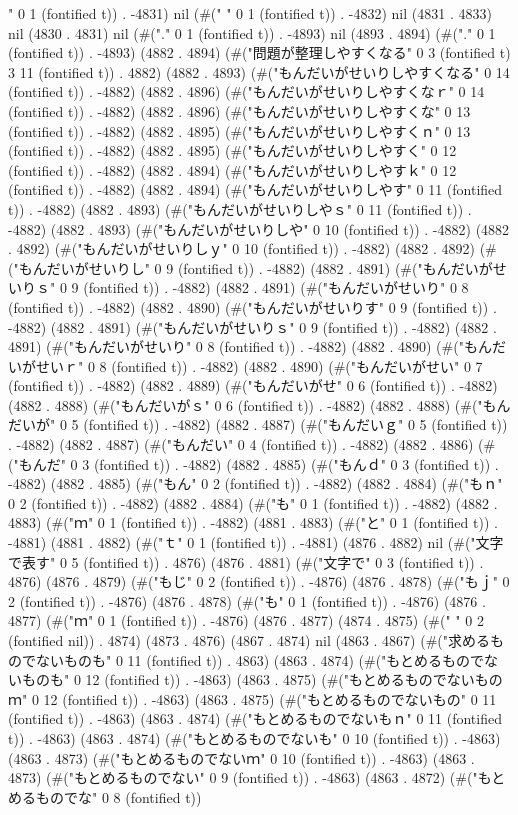 " 0 1 (fontified t)) . -4831) nil (#("	" 0 1 (fontified t)) . -4832) nil (4831 . 4833) nil (4830 . 4831) nil (#("." 0 1 (fontified t)) . -4893) nil (4893 . 4894) (#("." 0 1 (fontified t)) . -4893) (4882 . 4894) (#("問題が整理しやすくなる" 0 3 (fontified t) 3 11 (fontified t)) . 4882) (4882 . 4893) (#("もんだいがせいりしやすくなる" 0 14 (fontified t)) . -4882) (4882 . 4896) (#("もんだいがせいりしやすくなｒ" 0 14 (fontified t)) . -4882) (4882 . 4896) (#("もんだいがせいりしやすくな" 0 13 (fontified t)) . -4882) (4882 . 4895) (#("もんだいがせいりしやすくｎ" 0 13 (fontified t)) . -4882) (4882 . 4895) (#("もんだいがせいりしやすく" 0 12 (fontified t)) . -4882) (4882 . 4894) (#("もんだいがせいりしやすｋ" 0 12 (fontified t)) . -4882) (4882 . 4894) (#("もんだいがせいりしやす" 0 11 (fontified t)) . -4882) (4882 . 4893) (#("もんだいがせいりしやｓ" 0 11 (fontified t)) . -4882) (4882 . 4893) (#("もんだいがせいりしや" 0 10 (fontified t)) . -4882) (4882 . 4892) (#("もんだいがせいりしｙ" 0 10 (fontified t)) . -4882) (4882 . 4892) (#("もんだいがせいりし" 0 9 (fontified t)) . -4882) (4882 . 4891) (#("もんだいがせいりｓ" 0 9 (fontified t)) . -4882) (4882 . 4891) (#("もんだいがせいり" 0 8 (fontified t)) . -4882) (4882 . 4890) (#("もんだいがせいりす" 0 9 (fontified t)) . -4882) (4882 . 4891) (#("もんだいがせいりｓ" 0 9 (fontified t)) . -4882) (4882 . 4891) (#("もんだいがせいり" 0 8 (fontified t)) . -4882) (4882 . 4890) (#("もんだいがせいｒ" 0 8 (fontified t)) . -4882) (4882 . 4890) (#("もんだいがせい" 0 7 (fontified t)) . -4882) (4882 . 4889) (#("もんだいがせ" 0 6 (fontified t)) . -4882) (4882 . 4888) (#("もんだいがｓ" 0 6 (fontified t)) . -4882) (4882 . 4888) (#("もんだいが" 0 5 (fontified t)) . -4882) (4882 . 4887) (#("もんだいｇ" 0 5 (fontified t)) . -4882) (4882 . 4887) (#("もんだい" 0 4 (fontified t)) . -4882) (4882 . 4886) (#("もんだ" 0 3 (fontified t)) . -4882) (4882 . 4885) (#("もんｄ" 0 3 (fontified t)) . -4882) (4882 . 4885) (#("もん" 0 2 (fontified t)) . -4882) (4882 . 4884) (#("もｎ" 0 2 (fontified t)) . -4882) (4882 . 4884) (#("も" 0 1 (fontified t)) . -4882) (4882 . 4883) (#("ｍ" 0 1 (fontified t)) . -4882) (4881 . 4883) (#("と" 0 1 (fontified t)) . -4881) (4881 . 4882) (#("ｔ" 0 1 (fontified t)) . -4881) (4876 . 4882) nil (#("文字で表す" 0 5 (fontified t)) . 4876) (4876 . 4881) (#("文字で" 0 3 (fontified t)) . 4876) (4876 . 4879) (#("もじ" 0 2 (fontified t)) . -4876) (4876 . 4878) (#("もｊ" 0 2 (fontified t)) . -4876) (4876 . 4878) (#("も" 0 1 (fontified t)) . -4876) (4876 . 4877) (#("ｍ" 0 1 (fontified t)) . -4876) (4876 . 4877) (4874 . 4875) (#("  " 0 2 (fontified nil)) . 4874) (4873 . 4876) (4867 . 4874) nil (4863 . 4867) (#("求めるものでないものも" 0 11 (fontified t)) . 4863) (4863 . 4874) (#("もとめるものでないものも" 0 12 (fontified t)) . -4863) (4863 . 4875) (#("もとめるものでないものｍ" 0 12 (fontified t)) . -4863) (4863 . 4875) (#("もとめるものでないもの" 0 11 (fontified t)) . -4863) (4863 . 4874) (#("もとめるものでないもｎ" 0 11 (fontified t)) . -4863) (4863 . 4874) (#("もとめるものでないも" 0 10 (fontified t)) . -4863) (4863 . 4873) (#("もとめるものでないｍ" 0 10 (fontified t)) . -4863) (4863 . 4873) (#("もとめるものでない" 0 9 (fontified t)) . -4863) (4863 . 4872) (#("もとめるものでな" 0 8 (fontified t)) 
